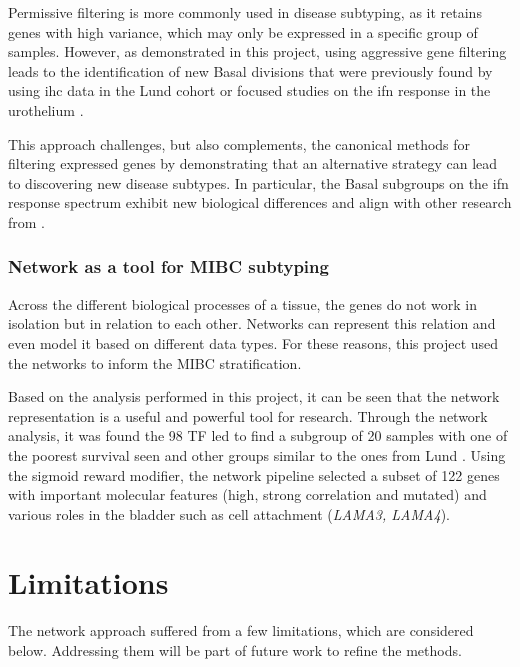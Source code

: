 Permissive filtering is more commonly used in disease subtyping, as it retains genes with high variance, which may only be expressed in a specific group of samples. However, as demonstrated in this project, using aggressive gene filtering leads to the identification of new Basal divisions that were previously found by using \acrshort{ihc} data in the Lund cohort \citep{Marzouka2018-ge} or focused studies on the \acrshort{ifn} response in the urothelium \citep{Baker2022-bj}.

This approach challenges, but also complements, the canonical methods for filtering expressed genes by demonstrating that an alternative strategy can lead to discovering new disease subtypes. In particular, the Basal subgroups on the \acrshort{ifn} response spectrum exhibit new biological differences and align with other research from \citep{Marzouka2018-ge,Baker2022-bj}.


\subsubsection*{Network as a tool for MIBC subtyping}

Across the different biological processes of a tissue, the genes do not work in isolation but in relation to each other. Networks can represent this relation and even model it based on different data types. For these reasons, this project used the networks to inform the MIBC stratification. 

Based on the analysis performed in this project, it can be seen that the network representation is a useful and powerful tool for research. Through the network analysis, it was found the 98 TF led to find a subgroup of 20 samples with one of the poorest survival seen and other groups similar to the ones from Lund \citep{Marzouka2018-ge, Baker2022-bj}. Using the sigmoid reward modifier, the network pipeline selected a subset of 122 genes with important molecular features (high, strong correlation and mutated) and various roles in the bladder such as cell attachment (\textit{LAMA3, LAMA4}).

\section{Limitations} \label{s:limitations}

The network approach suffered from a few limitations, which are considered below. Addressing them will be part of future work to refine the methods.

